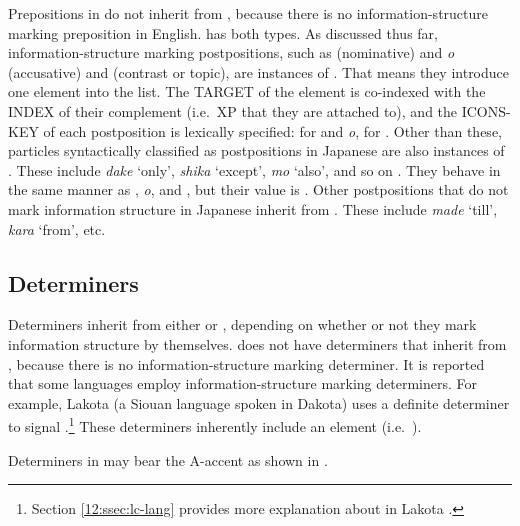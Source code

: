 Prepositions in  do not inherit from
, because there is no information-structure
marking preposition in English.   has both types. As
discussed thus far, information-structure marking postpositions, such
as {\ga} (nominative) and \textit{o} (accusative) and {\wa} (contrast
or topic), are instances of
. That means they introduce one element into
the  list. The TARGET of the  element is
co-indexed with the INDEX of their complement (i.e.\ XP that they are
attached to), and the ICONS-KEY of each postposition is lexically
specified:  for {\ga} and \textit{o},
 for \wa.  Other than these, 
particles syntactically classified as postpositions in Japanese are
also instances of .  These include
\textit{dake} `only', \textit{shika} `except', \textit{mo} `also', and
so on \citep{hasegawa:11,hasegawa:koenig:11}. They behave in the same
manner as {\ga}, \textit{o}, and {\wa}, but their  value
is . Other postpositions that do not
mark information structure in Japanese inherit from
. These include \textit{made} `till',
\textit{kara} `from', etc.





\subsection{Determiners}
\label{10:sssec:determiners}


Determiners inherit from either  or
, de\-pen\-ding on whether or not they mark
information structure by themselves.   does not have
determiners that inherit from , because there
is no information-structure marking determiner.  It is reported that
some languages employ information-structure marking determiners. For
example,  La\-ko\-ta (a Siou\-an language spoken in Dakota) uses a
definite determiner \textit{}
to signal .\footnote{Section \ref{12:ssec:lc-lang}
provides more explanation about
  \textit{} in Lakota .}
These determiners inherently include an  element
(i.e.\ ).

\newpage 
Determiners in  may bear the A-accent as shown in
.

